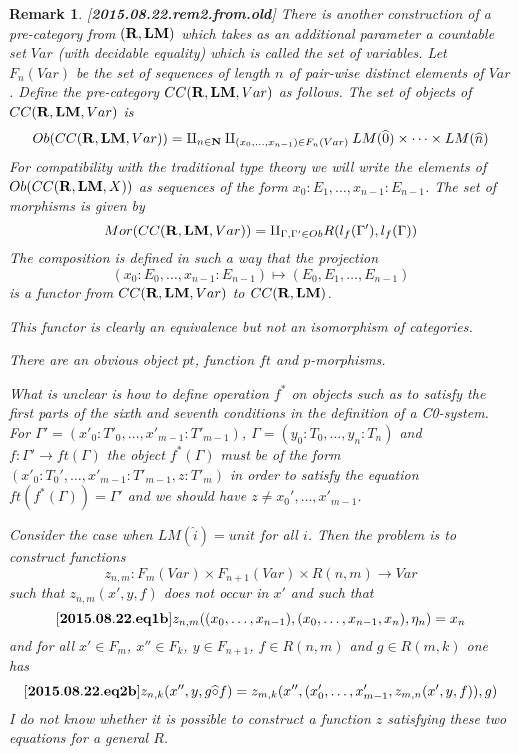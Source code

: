 \documentclass[11pt]{article}
\newenvironment{eq}{\begin{equation}}{\end{equation}}
\newtheorem{remark}[proposition]{Remark}
\newcommand{\llabel}[1]{\label{#1}[{\bf #1}]}
\newcommand{\sr}{\rightarrow}
\newcommand{\nn}{{\bf N\rm}}
\newcommand{\nat}{\nn}
\newcommand{\rr}{{\bf R}}
\newcommand{\lm}{{\bf LM}}
\newcommand{\wh}{\widehat}
\newcommand{\hc}{\wh{\circ}}
\begin{document}
\begin{remark}\rm
\llabel{2015.08.22.rem2.from.old}
%
There is another construction of a pre-category from $(\rr,\lm)$ which takes as an additional parameter a countable set $Var$ (with decidable equality) which is called the set of variables. Let $F_n(Var)$ be the set of sequences of length $n$ of pair-wise distinct elements of $Var$. Define the pre-category $CC(\rr,\lm,Var)$ as follows. The set of objects of $CC(\rr,\lm,Var)$ is 
%
$$Ob(CC(\rr,\lm,Var))= \amalg_{n\in\nat} \amalg_{(x_0,\dots,x_{n-1})\in F_n(Var)} LM(\wh{0})\times\dots\times LM(\wh{n})$$
%
For compatibility with the traditional type theory we will write the elements of $Ob(CC(\rr,\lm,X))$ as sequences of the form $x_0:E_1,\dots,x_{n-1}:E_{n-1}$. The set of morphisms is given by
%
$$Mor(CC(\rr,\lm,Var))=\amalg_{\Gamma,\Gamma'\in Ob}R(l_f(\Gamma'),l_f(\Gamma))$$
%
The composition is defined in such a way that the projection 
%
$$(x_0:E_0,\dots,x_{n-1}:E_{n-1})\mapsto (E_0,E_1,\dots,E_{n-1})$$
%
is a functor from $CC(\rr,\lm,Var)$ to $CC(\rr,\lm)$. 

This functor is clearly an equivalence but not an isomorphism of categories. 

There are an obvious object $pt$, function $ft$ and $p$-morphisms. 

What is unclear is how to define operation $f^*$ on objects such as to satisfy the first parts of the sixth and seventh conditions in the definition \cite[Definition 2.1]{Csubsystems} of a C0-system. For $\Gamma'=(x'_0:T'_0,\dots, x'_{m-1}:T'_{m-1})$, $\Gamma=(y_0:T_0,\dots,y_n:T_n)$ and $f:\Gamma'\sr ft(\Gamma)$ the object $f^*(\Gamma)$ must be of the form $(x'_0:T_0',\dots,x'_{m-1}:T'_{m-1}, z:T'_m)$ in order to satisfy the equation $ft(f^*(\Gamma))=\Gamma'$ and we should have $z\ne x_0',\dots,x'_{m-1}$.

Consider the case when $LM(\wh{i})=unit$ for all $i$. Then the problem is to construct functions 
%
$$z_{n,m}:F_m(Var)\times F_{n+1}(Var)\times R(n,m)\sr Var$$
%
such that $z_{n,m}(x',y,f)$ does not occur in $x'$ and such that
%
\begin{eq}
\llabel{2015.08.22.eq1b}
z_{n,m}((x_0,\dots,x_{n-1}),(x_0,\dots,x_{n-1},x_n),\eta_n)=x_n
\end{eq}
%
and for all $x'\in F_{m}$, $x''\in F_{k}$, $y\in F_{n+1}$, $f\in R(n,m)$ and $g\in R(m,k)$ one has
%
\begin{eq}
\llabel{2015.08.22.eq2b}
z_{n,k}(x'',y,g\hc f)=z_{m,k}(x'',(x'_0,\dots,x'_{m-1},z_{m,n}(x',y,f)),g)
\end{eq}
%
I do not know whether it is possible to construct a function $z$ satisfying these two equations for a general $R$.
\end{remark}
%
\end{document}
